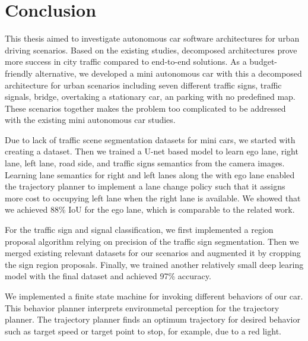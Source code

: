 \chapter{Conclusion}
\label{chp:b7}

This thesis aimed to investigate autonomous car software architectures for
urban driving scenarios. Based on the existing studies, decomposed
architectures prove more success in city traffic compared to end-to-end
solutions. As a budget-friendly alternative, we developed a mini autonomous car
with this a decomposed architecture for urban scenarios including seven
different traffic signs, traffic signals, bridge, overtaking a stationary car,
an parking with no predefined map. These scenarios together makes the problem
too complicated to be addressed with the existing mini autonomous car studies.

Due to lack of traffic scene segmentation datasets for mini cars, we started
with creating a dataset. Then we trained a U-net based model to learn ego lane,
right lane, left lane, road side, and traffic signs semantics from the camera
images. Learning lane semantics for right and left lanes along the with ego
lane enabled the trajectory planner to implement a lane change policy such that
it assigns more cost to occupying left lane when the right lane is available.
We showed that we achieved 88\% IoU for the ego lane, which is comparable to
the related work.

For the traffic sign and signal classification, we first implemented a region
proposal algorithm relying on precision of the traffic sign segmentation.  Then
we merged existing relevant datasets for our scenarios and augmented it by
cropping the sign region proposals. Finally, we trained another relatively
small deep learing model with the final dataset and achieved 97\% accuracy.

We implemented a finite state machine for invoking different behaviors of our
car. This behavior planner interprets environmetal perception for the
trajectory planner. The trajectory planner finds an optimum trajectory for
desired behavior such as target speed or target point to stop, for example, due
to a red light.

